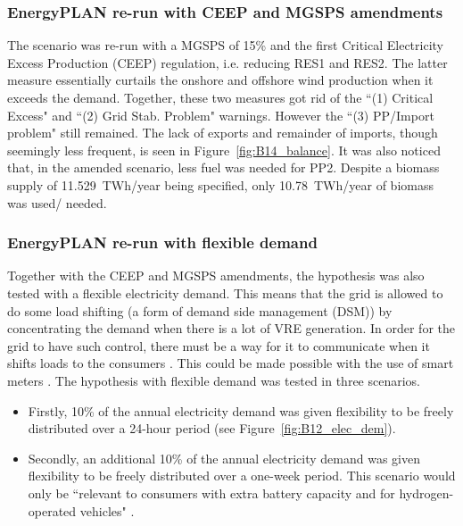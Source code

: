 \subsubsection{EnergyPLAN re-run with CEEP and MGSPS amendments}

The scenario was re-run with a MGSPS of 15\% and the first Critical Electricity Excess Production (CEEP) regulation, i.e. reducing RES1 and RES2.
The latter measure essentially curtails the onshore and offshore wind production when it exceeds the demand.
Together, these two measures got rid of the ``(1) Critical Excess" and ``(2) Grid Stab. Problem" warnings.
However the ``(3) PP/Import problem" still remained.
The lack of exports and remainder of imports, though seemingly less frequent, is seen in Figure~\ref{fig:B14_balance}.
It was also noticed that, in the amended scenario, less fuel was needed for PP2.
Despite a biomass supply of 11.529~TWh/year being specified, only 10.78~TWh/year of biomass was used/ needed.





\newpage
\subsubsection{EnergyPLAN re-run with flexible demand}



Together with the CEEP and MGSPS amendments, the hypothesis was also tested with a flexible electricity demand.
This means that the grid is allowed to do some load shifting (a form of demand side management (DSM)) by concentrating the demand when there is a lot of VRE generation.
In order for the grid to have such control, there must be a way for it to communicate when it shifts loads to the consumers \citep{Lund2017}.
This could be made possible with the use of smart meters \citep{Connolly2016}.
The hypothesis with flexible demand was tested in three scenarios.
\begin{itemize}
	\item Firstly, 10\% of the annual electricity demand was given flexibility to be freely distributed over a 24-hour period (see Figure~\ref{fig:B12_elec_dem}).
	\item Secondly, an additional 10\% of the annual electricity demand was given flexibility to be freely distributed over a one-week period.
	This scenario would only be ``relevant to consumers with extra battery capacity and for hydrogen-operated vehicles" \citep[p.~107]{Lund2017}.
\end{itemize}

